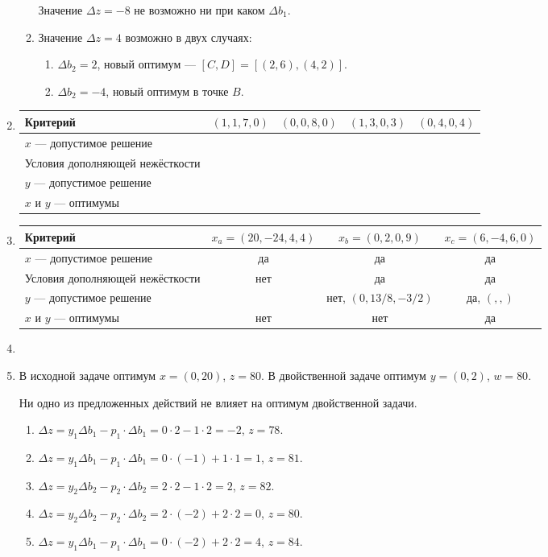 \documentclass[12pt]{article}
\begin{document}
\begin{enumerate}
\begin{enumerate}
Значение $\Delta z = -8$ не возможно ни при каком $\Delta b_1$.

\item Значение $\Delta z = 4$ возможно в двух случаях:
\begin{enumerate}
  \item $\Delta b_2 = 2$, новый оптимум — $[C, D] = [(2, 6), (4, 2)]$.
  \item $\Delta b_2 = -4$, новый оптимум в точке $B$.
\end{enumerate}

\end{enumerate}

\item %


\begin{tabular}{lcccc}
  Критерий & $(1, 1, 7, 0)$ & $(0, 0, 8, 0)$ & $(1, 3, 0, 3)$ & $(0, 4, 0, 4)$ \\
  \midrule
  $x$ — допустимое решение &  & &  & \\
  Условия дополняющей нежёсткости &  &  &  & \\
  $y$ — допустимое решение & & & & \\
  $x$ и $y$ — оптимумы &  &  & & \\
\end{tabular}


\item %

\begin{tabular}{lccc}
  Критерий & $x_a = (20, -24, 4, 4)$ & $x_b = (0, 2, 0, 9)$ & $x_c = (6, -4, 6, 0)$ \\
  \midrule
  $x$ — допустимое решение & да & да & да \\
  Условия дополняющей нежёсткости & нет & да & да \\
  $y$ — допустимое решение & & нет, $(0, 13/8, -3/2)$ & да, $(,,)$ \\
  $x$ и $y$ — оптимумы & нет & нет & да \\
\end{tabular}

\item %

\item %
В исходной задаче оптимум $x = (0, 20)$, $z=80$.
В двойственной задаче оптимум $ y = (0, 2)$, $w = 80$.

Ни одно из предложенных действий не влияет на оптимум двойственной задачи. 
\begin{enumerate}
  \item $\Delta z = y_1 \Delta b_1 - p_1 \cdot \Delta b_1 = 0 \cdot 2 - 1 \cdot 2 = -2$, $z= 78$.
  \item $\Delta z = y_1 \Delta b_1 - p_1 \cdot \Delta b_1 = 0 \cdot (-1) + 1 \cdot 1 = 1$, $z = 81$.
  \item $\Delta z = y_2 \Delta b_2 - p_2 \cdot \Delta b_2 = 2 \cdot 2 - 1 \cdot 2 = 2$, $z = 82$.
  \item $\Delta z = y_2 \Delta b_2 - p_2 \cdot \Delta b_2 = 2 \cdot (-2) + 2 \cdot 2 = 0$, $z = 80$.
  \item $\Delta z = y_1 \Delta b_1 - p_1 \cdot \Delta b_1 = 0 \cdot (-2) + 2 \cdot 2 = 4$, $z = 84$.
\end{enumerate}


\end{enumerate}
\end{document}
